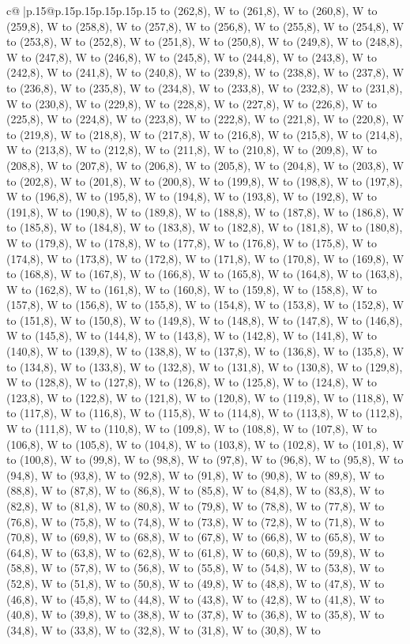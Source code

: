 \documentclass{article}
\begin{document}
{\begin{supertabular}{c@{$\;$}|p{.15\linewidth}@{}p{.15\linewidth}p{.15\linewidth}p{.15\linewidth}p{.15\linewidth}p{.15\linewidth}}
{{{to (262,8), W to (261,8), W to (260,8), W to (259,8), W to (258,8), W to (257,8), W to (256,8), W to (255,8), W to (254,8), W to (253,8), W to (252,8), W to (251,8), W to (250,8), W to (249,8), W to (248,8), W to (247,8), W to (246,8), W to (245,8), W to (244,8), W to (243,8), W to (242,8), W to (241,8), W to (240,8), W to (239,8), W to (238,8), W to (237,8), W to (236,8), W to (235,8), W to (234,8), W to (233,8), W to (232,8), W to (231,8), W to (230,8), W to (229,8), W to (228,8), W to (227,8), W to (226,8), W to (225,8), W to (224,8), W to (223,8), W to (222,8), W to (221,8), W to (220,8), W to (219,8), W to (218,8), W to (217,8), W to (216,8), W to (215,8), W to (214,8), W to (213,8), W to (212,8), W to (211,8), W to (210,8), W to (209,8), W to (208,8), W to (207,8), W to (206,8), W to (205,8), W to (204,8), W to (203,8), W to (202,8), W to (201,8), W to (200,8), W to (199,8), W to (198,8), W to (197,8), W to (196,8), W to (195,8), W to (194,8), W to (193,8), W to (192,8), W to (191,8), W to (190,8), W to (189,8), W to (188,8), W to (187,8), W to (186,8), W to (185,8), W to (184,8), W to (183,8), W to (182,8), W to (181,8), W to (180,8), W to (179,8), W to (178,8), W to (177,8), W to (176,8), W to (175,8), W to (174,8), W to (173,8), W to (172,8), W to (171,8), W to (170,8), W to (169,8), W to (168,8), W to (167,8), W to (166,8), W to (165,8), W to (164,8), W to (163,8), W to (162,8), W to (161,8), W to (160,8), W to (159,8), W to (158,8), W to (157,8), W to (156,8), W to (155,8), W to (154,8), W to (153,8), W to (152,8), W to (151,8), W to (150,8), W to (149,8), W to (148,8), W to (147,8), W to (146,8), W to (145,8), W to (144,8), W to (143,8), W to (142,8), W to (141,8), W to (140,8), W to (139,8), W to (138,8), W to (137,8), W to (136,8), W to (135,8), W to (134,8), W to (133,8), W to (132,8), W to (131,8), W to (130,8), W to (129,8), W to (128,8), W to (127,8), W to (126,8), W to (125,8), W to (124,8), W to (123,8), W to (122,8), W to (121,8), W to (120,8), W to (119,8), W to (118,8), W to (117,8), W to (116,8), W to (115,8), W to (114,8), W to (113,8), W to (112,8), W to (111,8), W to (110,8), W to (109,8), W to (108,8), W to (107,8), W to (106,8), W to (105,8), W to (104,8), W to (103,8), W to (102,8), W to (101,8), W to (100,8), W to (99,8), W to (98,8), W to (97,8), W to (96,8), W to (95,8), W to (94,8), W to (93,8), W to (92,8), W to (91,8), W to (90,8), W to (89,8), W to (88,8), W to (87,8), W to (86,8), W to (85,8), W to (84,8), W to (83,8), W to (82,8), W to (81,8), W to (80,8), W to (79,8), W to (78,8), W to (77,8), W to (76,8), W to (75,8), W to (74,8), W to (73,8), W to (72,8), W to (71,8), W to (70,8), W to (69,8), W to (68,8), W to (67,8), W to (66,8), W to (65,8), W to (64,8), W to (63,8), W to (62,8), W to (61,8), W to (60,8), W to (59,8), W to (58,8), W to (57,8), W to (56,8), W to (55,8), W to (54,8), W to (53,8), W to (52,8), W to (51,8), W to (50,8), W to (49,8), W to (48,8), W to (47,8), W to (46,8), W to (45,8), W to (44,8), W to (43,8), W to (42,8), W to (41,8), W to (40,8), W to (39,8), W to (38,8), W to (37,8), W to (36,8), W to (35,8), W to (34,8), W to (33,8), W to (32,8), W to (31,8), W to (30,8), W to }}}
\end{supertabular}}
\end{document}
